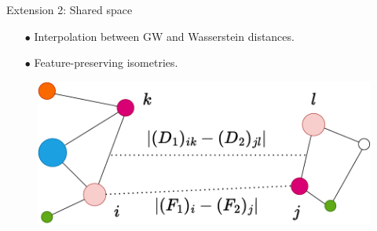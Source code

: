 \documentclass{beamer}
\begin{document}
\begin{frame}{Extension 2: Shared space}
  \begin{minipage}[t]{0.6\linewidth}
    \begin{itemize}
      \item[$\bullet$] Interpolation between GW and Wasserstein distances.
      \item[$\bullet$] Feature-preserving isometries.
    \end{itemize}
    \end{minipage}%
    \hfill%
    \hspace{-6cm}
    \begin{minipage}[t]{0.45\linewidth}
      \vspace{-0.cm}
    \begin{figure}
      \centering
      \includegraphics[width=\linewidth, keepaspectratio=true]{OT_new/fgw.pdf}
    \end{figure}
    \end{minipage}

\end{frame}
\end{document}
